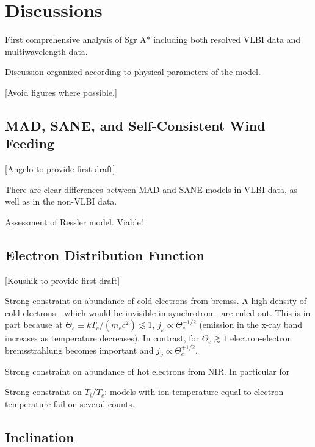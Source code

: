 \section{Discussions}\label{sec:discussions}

First comprehensive analysis of Sgr A* including both resolved VLBI data and multiwavelength data.

Discussion organized according to physical parameters of the model.

[Avoid figures where possible.]

\subsection{MAD, SANE, and Self-Consistent Wind Feeding}

[Angelo to provide first draft]

There are clear differences between MAD and SANE models in VLBI data, as well as in the non-VLBI data.

Assessment of Ressler model.  Viable!

\subsection{Electron Distribution Function}

[Koushik to provide first draft]

Strong constraint on abundance of cold electrons from bremss.  A high density of cold electrons - which would be invisible in synchrotron - are ruled out.  This is in part because at $\Theta_e \equiv k T_e/(m_e c^2) \lesssim 1$, $j_\nu \propto \Theta_e^{-1/2}$ (emission in the x-ray band increases as temperature decreases).  In contrast, for $\Theta_e \gtrsim 1$ electron-electron bremsstrahlung becomes important and $j_\nu \propto \Theta_e^{+1/2}$.

Strong constraint on abundance of hot electrons from NIR.  In particular for

Strong constraint on $T_i/T_e$: models with ion temperature equal to electron temperature fail on several counts.

\subsection{Inclination}

